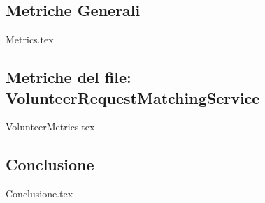 \documentclass[12pt]{article}
\begin{document}
\subsection{Metriche Generali}
{Metrics.tex}

\subsection{Metriche del file: VolunteerRequestMatchingService}
{VolunteerMetrics.tex}

\subsection{Conclusione}
{Conclusione.tex}
\end{document}
